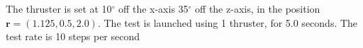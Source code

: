 The thruster is set at 10$^\circ$ off the x-axis 35$^\circ$ off the z-axis, in the position $\bm r = \left(1.125,0.5,2.0\right)$. The test is launched using 1 thruster, for 5.0 seconds. The test rate is 10 steps per second